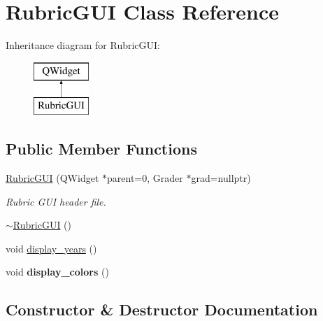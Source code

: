 \hypertarget{class_rubric_g_u_i}{}\section{Rubric\+G\+UI Class Reference}
\label{class_rubric_g_u_i}
Inheritance diagram for Rubric\+G\+UI\+:\begin{figure}[H]
\begin{center}
\leavevmode
\includegraphics[height=2.000000cm]{class_rubric_g_u_i}
\end{center}
\end{figure}
\subsection*{Public Member Functions}
\begin{DoxyCompactItemize}
\item 
\hyperlink{class_rubric_g_u_i_a2cf12ba52cb750196813237dfd274116}{Rubric\+G\+UI} (Q\+Widget $\ast$parent=0, Grader $\ast$grad=nullptr)
\begin{DoxyCompactList}\small\item\em Rubric G\+UI header file. \end{DoxyCompactList}\item 
\hyperlink{class_rubric_g_u_i_a27ab6b386b6a42b7e2485ef75f4016e9}{$\sim$\+Rubric\+G\+UI} ()
\item 
void \hyperlink{class_rubric_g_u_i_a94675fa3481bd37ae6e3ed57967cb6e1}{display\+\_\+years} ()
\item 
\mbox{\label{class_rubric_g_u_i_ab6b61d869f748fecaa2321fcc326d92f}} 
void {\bfseries display\+\_\+colors} ()
\end{DoxyCompactItemize}


\subsection{Constructor \& Destructor Documentation}
\mbox{\label{class_rubric_g_u_i_a2cf12ba52cb750196813237dfd274116}} 
